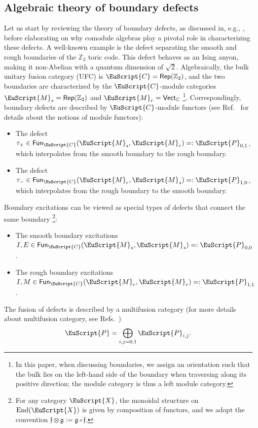 \documentclass[a4paper,11pt]{article}
\theoremstyle{definition}
\theoremstyle{remark}
\newcommand\eC           {\EuScript{C}}
\newcommand\eM          {\EuScript{M}}
\newcommand\eP         {\EuScript{P}}
\newcommand\eX         {\EuScript{X}}
\newcommand{\Zbb}{\mathbb{Z}}
\newcommand{\Cbb}{\mathbb{C}}
\newcommand{\Rep}{\mathsf{Rep}}
\newcommand{\End}{\operatorname{End}}
\newcommand{\Fun}{\mathsf{Fun}}
\newcommand{\Vect}{\mathsf{Vect}}
\begin{document}
\subsection{Algebraic theory of boundary defects} 

Let us start by reviewing the theory of boundary defects, as discussed in, e.g., \cite{Kitaev2012boundary,cong2017defects}, before elaborating on why comodule algebras play a pivotal role in characterizing these defects. 
A well-known example is the defect separating the smooth and rough boundaries of the $\Zbb_2$ toric code. This defect behaves as an Ising anyon, making it non-Abelian with a quantum dimension of $\sqrt{2}$.  
Algebraically, the bulk unitary fusion category (UFC) is $\eC=\Rep(\Zbb_2)$, and the two boundaries are characterized by the $\eC$-module categories $\eM_s=\Rep(\Zbb_2)$ and $\eM_r=\Vect_{\Cbb}$ \footnote{In this paper, when discussing boundaries, we assign an orientation such that the bulk lies on the left-hand side of the boundary when traversing along its positive direction; the module category is thus a left module category.}. 
Correspondingly, boundary defects are described by $\eC$-module functors (see Ref.~\cite{etingof2016tensor} for details about the notions of module functors):
\begin{itemize}
    \item The defect $\tau_+ \in \Fun_{\eC}(\eM_s,\eM_r) =: \eP_{0,1}$, which interpolates from the smooth boundary to the rough boundary.
    \item The defect $\tau_- \in \Fun_{\eC}(\eM_r,\eM_s) =: \eP_{1,0}$, which interpolates from the rough boundary to the smooth boundary.
\end{itemize}
Boundary excitations can be viewed as special types of defects that connect the same boundary \footnote{For any category $\eX$, the monoidal structure on $\End(\eX)$ is given by composition of functors, and we adopt the convention $\mathfrak{f}\otimes \mathfrak{g} := \mathfrak{g}\circ\mathfrak{f}$.}:
\begin{itemize}
    \item The smooth boundary excitations $I,E \in \Fun_{\eC}(\eM_s,\eM_s) =: \eP_{0,0}$.
    \item The rough boundary excitations $I,M \in \Fun_{\eC}(\eM_r,\eM_r) =: \eP_{1,1}$.
\end{itemize}
The fusion of defects is described by a multifusion category (for more details about multifusion category, see Refs.~\cite{jia2024weakTube,kong2019multifusion,etingof2016tensor})
\begin{equation}
    \eP = \bigoplus_{i,j=0,1} \eP_{i,j}.
\end{equation}
\end{document}
